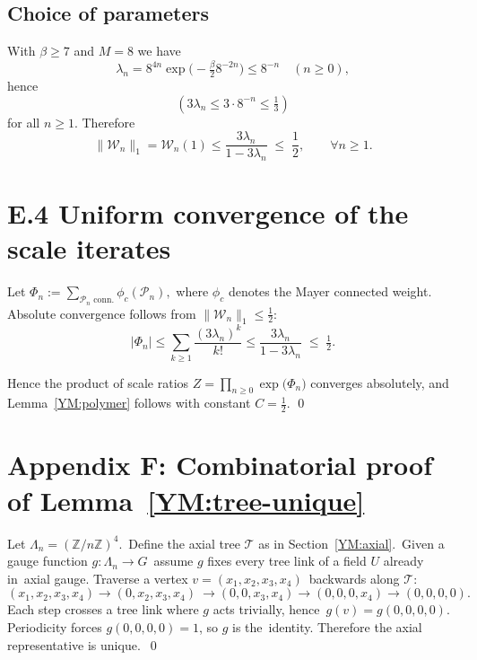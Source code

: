 \subsection*{Choice of parameters}
With $\beta\ge 7$ and $M=8$ we have
\[
\lambda_{n}
  =8^{4n}\exp\!\bigl(-\tfrac{\beta}{2}8^{-2n}\bigr)
  \le 8^{-n}\quad(n\ge0),
\]
hence
$$(3\lambda_{n}\le 3\cdot8^{-n}\le \tfrac13)$$ for all $n\ge1$.
Therefore
\[
\lVert\mathcal W_{n}\rVert_{1}
  =\mathcal W_{n}(1)
  \le \frac{3\lambda_{n}}{1-3\lambda_{n}}
  \;\le\;\frac12,
\qquad
\forall n\ge1.
\]

\bigskip
\section*{E.4  Uniform convergence of the scale iterates}

Let
\(
\Phi_{n}:=\sum_{\mathcal P_{n}\text{ conn.}}
               \phi_{c}(\mathcal P_{n}),
\)
where $\phi_{c}$ denotes the Mayer connected weight.
Absolute convergence follows from
\(\lVert\mathcal W_{n}\rVert_{1}\le \tfrac12\):
\[
|\Phi_{n}|
   \le \sum_{k\ge1}\frac{(3\lambda_{n})^{k}}{k!}
   \le \frac{3\lambda_{n}}{1-3\lambda_{n}}
   \;\le\;\tfrac12.
\]

Hence the product of scale ratios
\(Z=\prod_{n\ge0}\exp\!\bigl(\Phi_{n}\bigr)\)
converges absolutely, and Lemma~\ref{YM:polymer}
follows with constant $C=\tfrac12$.
\qed

\section{Appendix F: Combinatorial proof of Lemma~\ref{YM:tree-unique}}

Let $\Lambda_{n}=(\mathbb Z/n\mathbb Z)^{4}$.\
Define the axial tree $\mathcal T$ as in Section~\ref{YM:axial}.\
Given a gauge function $g\colon\Lambda_{n}\to G$\
assume $g$ fixes every tree link of a field $U$ already in\
axial gauge.  Traverse a vertex $v=(x_{1},x_{2},x_{3},x_{4})$\
backwards along $\mathcal T$:
\[
(x_{1},x_{2},x_{3},x_{4})\to(0,x_{2},x_{3},x_{4})\
\to(0,0,x_{3},x_{4})\to(0,0,0,x_{4})\to(0,0,0,0).
\]
Each step crosses a tree link where $g$ acts trivially, hence\
$g(v)=g(0,0,0,0)$.  Periodicity forces $g(0,0,0,0)=1$, so $g$ is the\
identity.  Therefore the axial representative is unique.\
\qed 